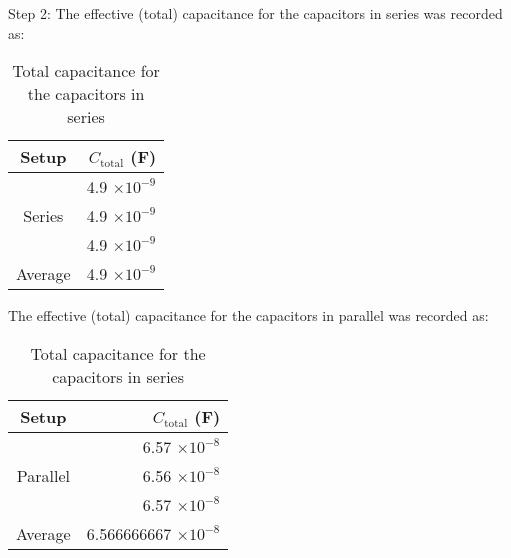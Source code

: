 \documentclass [12pt, letterpaper, twoside] {article}
\begin{document}
\noindent
Step 2:
The effective (total) capacitance for the capacitors in series was recorded as:
\begin{table}[h!]
  \centering
  \begin{tabular}{| c | r |}
    \hline\hline
    Setup & \(C_{\text{total}}\) (F) \\
    \hline
    \multirow {3}{*}{Series} & 4.9 \(\times{10}^{-9}\) \\
    & 4.9 \(\times{10}^{-9}\) \\
    & 4.9 \(\times{10}^{-9}\) \\
    \hline
    Average & 4.9 \(\times{10}^{-9}\) \\
    \hline\hline
  \end{tabular}
  \caption{Total capacitance for the capacitors in series}
\end{table}

\noindent
The effective (total) capacitance for the capacitors in parallel was recorded as:
\begin{table}[h!]
  \centering
  \begin{tabular}{| c | r |}
    \hline\hline
    Setup & \(C_{\text{total}}\) (F) \\
    \hline
    \multirow {3}{*}{Parallel} & 6.57 \(\times{10}^{-8}\) \\
    & 6.56 \(\times{10}^{-8}\) \\
    & 6.57 \(\times{10}^{-8}\) \\
    \hline
    Average & 6.566666667 \(\times{10}^{-8}\) \\
    \hline\hline
  \end{tabular}
  \caption{Total capacitance for the capacitors in series}
\end{table}
\end{document}
